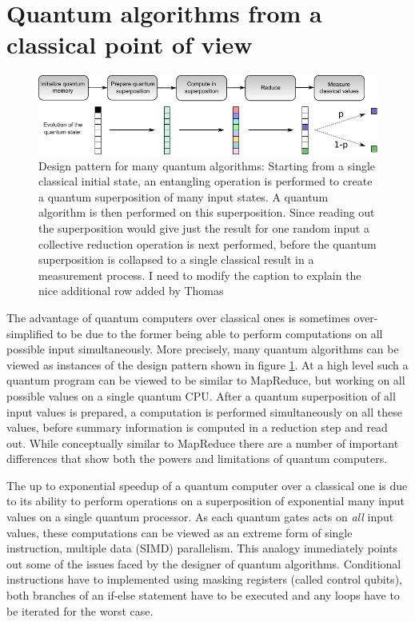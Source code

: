\documentclass[journal]{IEEEtran}
\begin{document}
\section{Quantum algorithms from a classical point of view}
\label{sec:box3}

\begin{figure}[t]
\centering
\includegraphics[width=\textwidth]{figures/simd}
\caption{Design pattern for many quantum algorithms: Starting from a single classical initial state, an entangling operation is performed to create a quantum superposition of many input states. A quantum algorithm is then performed on this superposition. Since reading out the superposition would give just the result for one random input a collective reduction operation is next performed, before the quantum superposition is collapsed to a single classical result in a measurement process. {\color{red} I need to modify the caption to explain the nice additional row added by Thomas} }
\label{fig:simd}
\end{figure}


The advantage of quantum computers over classical ones is sometimes over-simplified to be due to the former being able to perform computations on all possible input simultaneously. More precisely, many quantum algorithms can be viewed as instances of the design pattern shown in figure \ref{fig:simd}. At a high level such a quantum program can be viewed to be similar to MapReduce, but working on all possible values on a single quantum CPU. After a quantum superposition of all input values is prepared, a computation is performed simultaneously on all these values, before summary information is computed in a reduction step and read out. 
While conceptually similar to MapReduce there are a number of important differences that show both the powers and limitations of quantum computers.

The up to exponential speedup of a quantum computer over a classical one is due to its ability to perform operations on a superposition of exponential many input values on a single quantum processor. As each quantum gates acts on {\em all} input values, these computations can be viewed as an extreme form of single instruction, multiple data (SIMD) parallelism. This analogy immediately points out some of the issues faced by the designer of quantum algorithms. Conditional instructions have to implemented using masking registers (called control qubits), both branches of an if-else statement have to be executed and any loops have to be iterated for the worst case.
\end{document}
